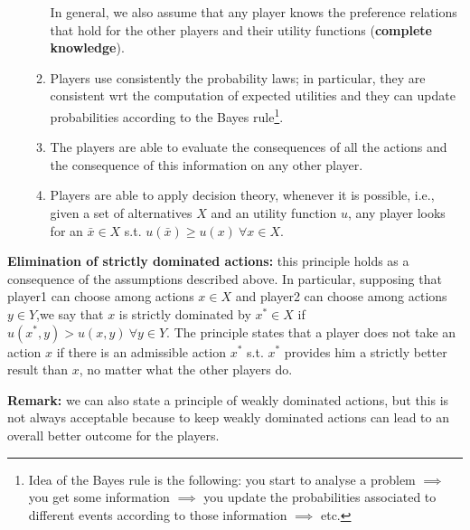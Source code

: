 \documentclass[pt11,a4paper,twoside,reqno,openright]{paper}
\begin{document}
\begin{enumerate}
\begin{enumerate}
		\noindent In general, we also assume that any player knows the 
		preference relations that hold for the other players and their 
		utility functions (\textbf{complete knowledge}).

		\item Players use consistently the probability laws; in particular, 
		they are consistent wrt the computation of expected utilities and 
		they can update probabilities according to the Bayes 
		rule\footnote{Idea of the Bayes rule is the following: you start to 
		analyse a problem $\implies$ you get some information $\implies$ you 
		update the probabilities associated to different events according to 
		those information $\implies$ etc.}.

		\item The players are able to evaluate the consequences of all the 
		actions and the consequence of this information on any other player.

		\item Players are able to apply decision theory, whenever it is 
		possible, i.e., given a set of alternatives $X$ and an utility function 
		$u$, any player looks for an $\bar{x} \in X$ s.t. 
		$u(\bar{x}) \geq u(x) ~\forall x \in X$.
	\end{enumerate}	
\end{enumerate}

\noindent \textbf{Elimination of strictly dominated actions:} this principle 
holds as a consequence of the assumptions described above. In particular, 
supposing that player1 can choose among actions $x \in X$ and player2 can 
choose among actions $y \in Y$,we say that $x$ is strictly dominated by 
$x^* \in X$ if $u(x^*,y) > u(x,y) ~\forall y \in Y$. The principle states that 
a player does not take an action $x$ if there is an admissible action $x^*$ s.t. 
$x^*$ provides him a strictly better result than $x$, no matter what the other 
players do.

\noindent \textbf{Remark:} we can also state a principle of weakly dominated 
actions, but this is not always acceptable because to keep weakly dominated 
actions can lead to an overall better outcome for the players.
\end{document}
